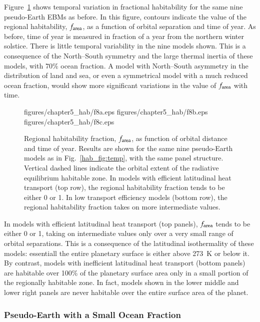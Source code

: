 Figure~\ref{hab_fig:space hab} shows temporal variation in fractional
habitability for the same nine pseudo-Earth EBMs as before.  In this
figure, contours indicate the value of the regional habitability,
$f_{\rm area}$, as a function of orbital separation and time of year.
As before, time of year is measured in fraction of a year from the
northern winter solstice.  There is little temporal variability in the
nine models shown.  This is a consequence of the North--South symmetry
and the large thermal inertia of these models, with $70$\% ocean
fraction.  A model with North--South asymmetry in the distribution of
land and sea, or even a symmetrical model with a much reduced ocean
fraction, would show more significant variations in the value of
$f_{\rm area}$ with time.
\begin{figure}[p]
\plotthree
{figures/chapter5_hab/f8a.eps}
{figures/chapter5_hab/f8b.eps}
{figures/chapter5_hab/f8c.eps}
\caption[Regional habitability fraction, $f_{\rm area}$, as function
of orbital distance and time of year.]{Regional habitability fraction,
$f_{\rm area}$, as function of orbital distance and time of year.
Results are shown for the same nine pseudo-Earth models as in
Fig.~\ref{hab_fig:temp}, with the same panel structure.  Vertical
dashed lines indicate the orbital extent of the radiative equilibrium
habitable zone.  In models with efficient latitudinal heat transport
(top row), the regional habitability fraction tends to be either 0 or
1.  In low transport efficiency models (bottom row), the regional
habitability fraction takes on more intermediate values.}
\label{hab_fig:space hab}
\end{figure}
\afterpage{\clearpage}

In models with efficient latitudinal heat transport (top panels),
$f_{\rm area}$ tends to be either 0 or 1, taking on intermediate
values only over a very small range of orbital separations.  This is a
consequence of the latitudinal isothermality of these models:
essentiall the entire planetary surface is either above 273~K or below
it.  By contrast, models with inefficient latitudinal heat transport
(bottom panels) are habitable over 100\% of the planetary surface area
only in a small portion of the regionally habitable zone.  In fact,
models shown in the lower middle and lower right panels are never
habitable over the entire surface area of the planet.


\subsubsection{Pseudo-Earth with a Small Ocean Fraction}
\label{hab_sssec:less ocean}

